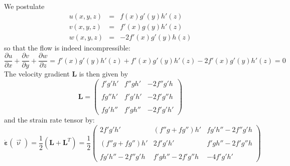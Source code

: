 We postulate
\begin{eqnarray}
u(x,y,z) &=& f(x) g'(y) h'(z) \\
v(x,y,z) &=& f'(x) g(y) h'(z) \\
w(x,y,z) &=& -2f'(x) g'(y) h(z) 
\end{eqnarray}
so that the flow is indeed incompressible: 
\[
\frac{\partial u}{\partial x}+
\frac{\partial v}{\partial y}+
\frac{\partial w}{\partial z}
=
f'(x) g'(y) h'(z) + f'(x) g'(y) h'(z) -2f'(x) g'(y) h'(z)
=0
\]
The velocity gradient ${\bm L}$ is then given by
\[
{\bm L} =
\left(
\begin{array}{ccc}
f'g'h' &  f'' g h' & -2f'' g' h \\ \\
fg''h' & f'g'h'    & -2f' g'' h \\ \\
fg'h'' & f'gh''    & -2f'g'h'
\end{array}
\right)
\]
and the strain rate tensor by:
\[
\dot{\bm \varepsilon}(\vec\upnu)
=\frac{1}{2}({\bm L}+{\bm L}^T)
=
\frac{1}{2}
\left(
\begin{array}{ccc}
2f'g'h' & (f'' g+fg'') h'  & fg'h''-2f'' g' h \\ \\
(f''g+fg'')h' & 2f'g'h'    & f'gh''-2f' g'' h \\ \\
fg'h'' -2f'' g' h & f'gh'' -2f' g'' h    & -4f'g'h'
\end{array}
\right)
\]

